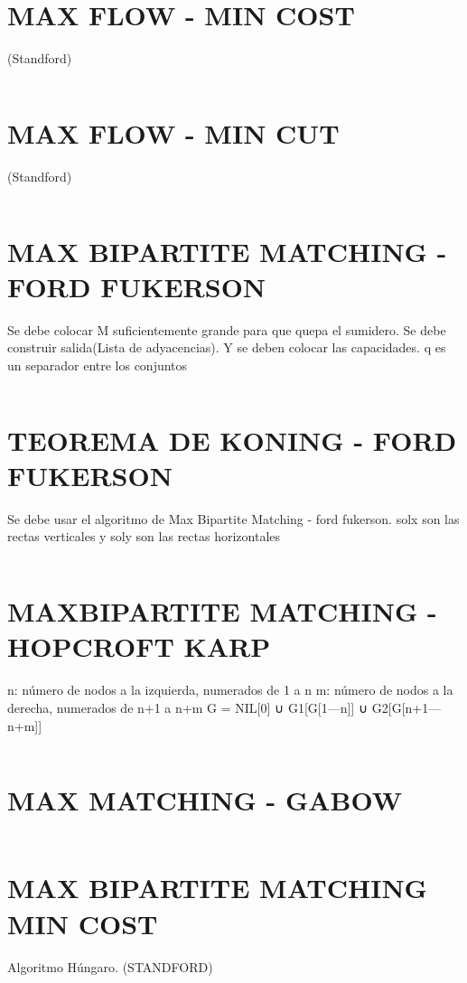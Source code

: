 \documentclass{article}
\begin{document}
\section*{MAX FLOW - MIN COST}
(Standford)
\inputminted[]{c++}{algorithms/MAXFLOWMINCOST.cpp}
\newpage

\section*{MAX FLOW - MIN CUT}
(Standford)
\inputminted[]{c++}{algorithms/MINCUT.cpp}
\newpage


\section*{MAX BIPARTITE MATCHING - FORD FUKERSON}
Se debe colocar M suficientemente grande para que quepa el sumidero.
Se debe construir salida(Lista de adyacencias). Y se deben colocar las capacidades.
q es un separador entre los conjuntos
\inputminted[]{c++}{algorithms/MAXBIPARTITEMATCHINGFF.cpp}
\newpage

\section*{TEOREMA DE KONING - FORD FUKERSON}
Se debe usar el algoritmo de Max Bipartite Matching - ford fukerson. \newline
solx son las rectas verticales y soly son las rectas horizontales
\inputminted[]{c++}{algorithms/KONING.cpp}
\newpage

\section*{MAXBIPARTITE MATCHING - HOPCROFT KARP}
n: n\'umero de nodos a la izquierda, numerados de 1 a n
m: n\'umero de nodos a la derecha, numerados de n+1 a n+m
G = NIL[0] ∪ G1[G[1---n]] ∪ G2[G[n+1---n+m]]
\inputminted[]{c++}{algorithms/MAXBIPARTITEMATCHINGHK.cpp}
\newpage

\section*{MAX MATCHING - GABOW}
\inputminted[]{c++}{algorithms/GABOW.cpp}
\newpage

\section*{MAX BIPARTITE MATCHING MIN COST}
Algoritmo H\'ungaro. (STANDFORD)
\inputminted[]{c++}{algorithms/HUNGARIAN2.cpp}
\newpage
\end{document}
